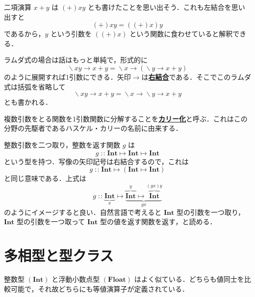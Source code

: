 \documentclass[a4paper,twocolumn]{jsbook}
\newcommand{\keyword}[1]{{\underline{\textbf{#1}}}}
\DeclareMathOperator{\mIn}{{:\!:}}
\DeclareMathOperator{\mLambda}{\backslash}
\DeclareMathOperator{\mLambdaArrow}{\rightarrow}
\DeclareMathOperator{\mMapsTo}{\mapsto}
\newcommand{\mType}[1]{\mathbf{#1}}
\newcommand{\mFloatType}{\mType{Float}}
\newcommand{\mIntType}{\mType{Int}}
\newcommand{\mLambdaExp}[2]{\mLambda{#1}\mLambdaArrow{#2}}
\newcommand{\mProj}[2]{#1\mMapsTo#2}
\begin{document}
二項演算 $x+y$ は $(+)xy$ とも書けたことを思い出そう．これも左結合を思い出すと
\begin{equation}
(+)xy=\left((+)x\right)y
\end{equation}
であるから，$y$ という引数を $\left((+)x\right)$ という関数に食わせていると解釈できる．

ラムダ式の場合は話はもっと単純で，形式的に
\begin{equation}
\mLambdaExp{xy}{x+y}
=\mLambdaExp{x}{\left(\mLambdaExp{y}{x+y}\right)}
\end{equation}
のように展開すれば1引数にできる．矢印$\mLambdaArrow$は\keyword{右結合}である．そこでこのラムダ式は括弧を省略して
\begin{equation}
\mLambdaExp{xy}{x+y}
=\mLambdaExp{x}{\mLambdaExp{y}{x+y}}
\end{equation}
とも書かれる．

複数引数をとる関数を1引数関数に分解することを\keyword{カリー化}と呼ぶ．これはこの分野の先駆者であるハスケル・カリーの名前に由来する．


整数引数を二つ取り，整数を返す関数 $g$ は
\begin{equation}
g\mIn\mProj{\mIntType}{\mProj{\mIntType}{\mIntType}}
\end{equation}
という型を持つ．写像の矢印記号は右結合するので，これは
\begin{equation}
g\mIn\mProj{\mIntType}{\left(\mProj{\mIntType}{\mIntType}\right)}
\end{equation}
と同じ意味である．上式は
\begin{equation*}
g\mIn
\underbrace{\mIntType}_x
\mMapsTo
\underbrace{\overbrace{\mIntType}^y
\mMapsTo\overbrace{\mIntType}^{(gx)y}}_{gx}
\end{equation*}
のようにイメージすると良い．自然言語で考えると $\mIntType$ 型の引数を一つ取り，$\mIntType$ 型の引数を一つ取って $\mIntType$ 型の値を返す関数を返す，と読める．


\section{多相型と型クラス}

整数型 $(\mIntType)$ と浮動小数点型 $(\mFloatType)$ はよく似ている．どちらも値同士を比較可能で，それ故どちらにも等値演算子が定義されている．
\end{document}
